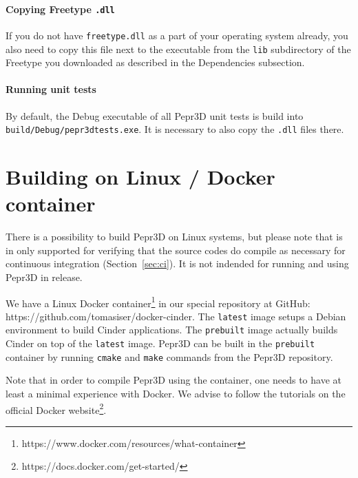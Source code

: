 \paragraph{Copying Freetype \texttt{.dll}}
If you do not have \texttt{freetype.dll} as a part of your operating system already, you also need to copy this file next to the executable from the \texttt{lib} subdirectory of the Freetype you downloaded as described in the Dependencies subsection.

\paragraph{Running unit tests}
By default, the Debug executable of all Pepr3D unit tests is build into \texttt{build/Debug/pepr3dtests.exe}.
It is necessary to also copy the \texttt{.dll} files there.

\section{Building on Linux / Docker container}

There is a possibility to build Pepr3D on Linux systems, but please note that is in only supported for verifying that the source codes do compile as necessary for continuous integration (Section~\ref{sec:ci}).
It is not indended for running and using Pepr3D in release.

We have a Linux Docker container\footnote{https://www.docker.com/resources/what-container} in our special repository at GitHub: https://github.com/tomasiser/docker-cinder.
The \texttt{latest} image setups a Debian environment to build Cinder applications.
The \texttt{prebuilt} image actually builds Cinder on top of the \texttt{latest} image.
Pepr3D can be built in the \texttt{prebuilt} container by running \texttt{cmake} and \texttt{make} commands from the Pepr3D repository.

Note that in order to compile Pepr3D using the container, one needs to have at least a minimal experience with Docker.
We advise to follow the tutorials on the official Docker website\footnote{https://docs.docker.com/get-started/}.
